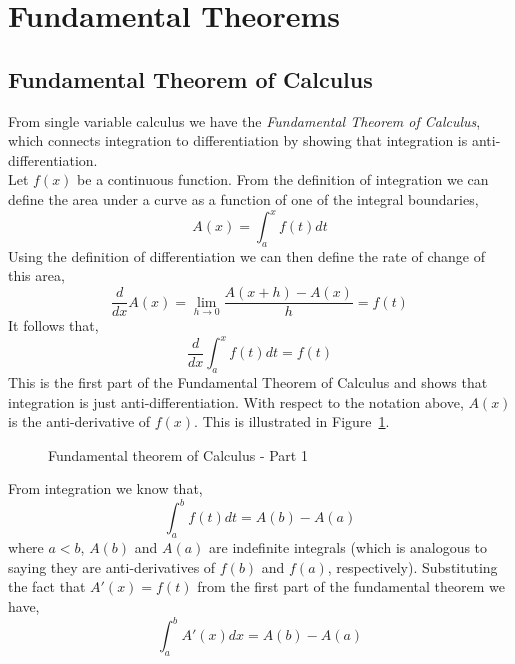 \documentclass[12pt]{article}
\begin{document}
\pagebreak
\section{Fundamental Theorems}

\subsection{Fundamental Theorem of Calculus}

From single variable calculus we have the \emph{Fundamental Theorem of Calculus}, which connects integration to differentiation by showing that integration is anti-differentiation. \\

Let $f(x)$ be a continuous function. From the definition of integration we can define the area under a curve as a function of one of the integral boundaries,
\[
A(x) = \int_{a}^{x} f(t) dt
\]
Using the definition of differentiation we can then define the rate of change of this area,
\[
\frac{d}{dx}A(x) = \lim_{h\rightarrow0} \frac{A(x+h)-A(x)}{h} = f(t)
\]
It follows that,
\[
\frac{d}{dx} \int_{a}^{x} f(t) dt = f(t)
\]
This is the first part of the Fundamental Theorem of Calculus and shows that integration is just anti-differentiation. With respect to the notation above, $A(x)$ is the anti-derivative of $f(x)$. This is illustrated in Figure~\ref{fig:ftc1}. \\

\begin{figure}[h!]
\centering
\caption{Fundamental theorem of Calculus - Part 1}
\label{fig:ftc1}
\end{figure}

From integration we know that,
\[
\int_{a}^{b} f(t)dt = A(b) - A(a) 
\] 
where $a<b$, $A(b)$ and $A(a)$ are indefinite integrals (which is analogous to saying they are anti-derivatives of $f(b)$ and $f(a)$, respectively). Substituting the fact that $A'(x) = f(t)$ from the first part of the fundamental theorem we have,
\[
\int_{a}^{b} A'(x)dx = A(b) - A(a) 
\]
\end{document}
